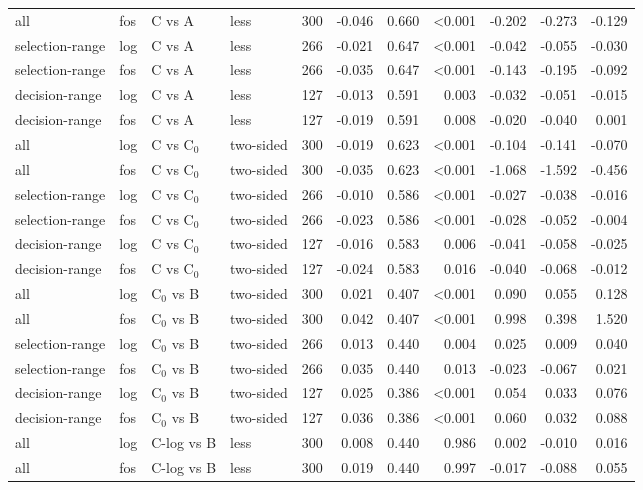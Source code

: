 \begin{longtable}{llllrrrrrrr}
all & fos & C vs A & less & 300 & -0.046 & 0.660 & <0.001 & -0.202 & -0.273 & -0.129 \\
selection-range & log & C vs A & less & 266 & -0.021 & 0.647 & <0.001 & -0.042 & -0.055 & -0.030 \\
selection-range & fos & C vs A & less & 266 & -0.035 & 0.647 & <0.001 & -0.143 & -0.195 & -0.092 \\
decision-range & log & C vs A & less & 127 & -0.013 & 0.591 & 0.003 & -0.032 & -0.051 & -0.015 \\
decision-range & fos & C vs A & less & 127 & -0.019 & 0.591 & 0.008 & -0.020 & -0.040 & 0.001 \\
all & log & C vs C$_0$ & two-sided & 300 & -0.019 & 0.623 & <0.001 & -0.104 & -0.141 & -0.070 \\
all & fos & C vs C$_0$ & two-sided & 300 & -0.035 & 0.623 & <0.001 & -1.068 & -1.592 & -0.456 \\
selection-range & log & C vs C$_0$ & two-sided & 266 & -0.010 & 0.586 & <0.001 & -0.027 & -0.038 & -0.016 \\
selection-range & fos & C vs C$_0$ & two-sided & 266 & -0.023 & 0.586 & <0.001 & -0.028 & -0.052 & -0.004 \\
decision-range & log & C vs C$_0$ & two-sided & 127 & -0.016 & 0.583 & 0.006 & -0.041 & -0.058 & -0.025 \\
decision-range & fos & C vs C$_0$ & two-sided & 127 & -0.024 & 0.583 & 0.016 & -0.040 & -0.068 & -0.012 \\
all & log & C$_0$ vs B & two-sided & 300 & 0.021 & 0.407 & <0.001 & 0.090 & 0.055 & 0.128 \\
all & fos & C$_0$ vs B & two-sided & 300 & 0.042 & 0.407 & <0.001 & 0.998 & 0.398 & 1.520 \\
selection-range & log & C$_0$ vs B & two-sided & 266 & 0.013 & 0.440 & 0.004 & 0.025 & 0.009 & 0.040 \\
selection-range & fos & C$_0$ vs B & two-sided & 266 & 0.035 & 0.440 & 0.013 & -0.023 & -0.067 & 0.021 \\
decision-range & log & C$_0$ vs B & two-sided & 127 & 0.025 & 0.386 & <0.001 & 0.054 & 0.033 & 0.076 \\
decision-range & fos & C$_0$ vs B & two-sided & 127 & 0.036 & 0.386 & <0.001 & 0.060 & 0.032 & 0.088 \\
all & log & C-log vs B & less & 300 & 0.008 & 0.440 & 0.986 & 0.002 & -0.010 & 0.016 \\
all & fos & C-log vs B & less & 300 & 0.019 & 0.440 & 0.997 & -0.017 & -0.088 & 0.055 \\

\end{longtable}
